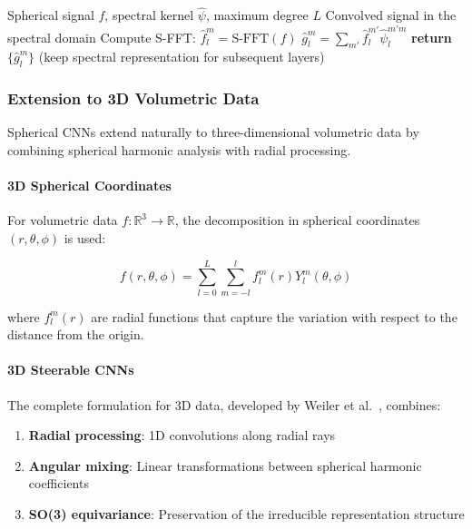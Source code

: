 \begin{algorithm}[h]
\caption{Efficient Spherical CNN Convolution}
\label{alg:spherical_conv}
\begin{algorithmic}[1]
\Require Spherical signal $f$, spectral kernel $\hat{\psi}$, maximum degree $L$
\Ensure Convolved signal in the spectral domain
\State Compute S-FFT: $\hat{f}_l^m = \text{S-FFT}(f)$
        \State $\hat{g}_l^m = \sum_{m'} \hat{f}_l^{m'} \hat{\psi}_l^{m'm}$
    \EndFor
\EndFor
\State \textbf{return} $\{\hat{g}_l^m\}$ (keep spectral representation for subsequent layers)
\end{algorithmic}
\end{algorithm}

\subsubsection{Extension to 3D Volumetric Data}

Spherical CNNs extend naturally to three-dimensional volumetric data by combining spherical harmonic analysis with radial processing.

\paragraph{3D Spherical Coordinates}

For volumetric data $f: \mathbb{R}^3 \to \mathbb{R}$, the decomposition in spherical coordinates $(r, \theta, \phi)$ is used:

\begin{equation}
f(r, \theta, \phi) = \sum_{l=0}^{L} \sum_{m=-l}^{l} f_l^m(r) Y_l^m(\theta, \phi)
\end{equation}

where $f_l^m(r)$ are radial functions that capture the variation with respect to the distance from the origin.

\paragraph{3D Steerable CNNs}

The complete formulation for 3D data, developed by Weiler et al.~\citep{weiler2018steerable}, combines:

\begin{enumerate}
    \item \textbf{Radial processing}: 1D convolutions along radial rays
    \item \textbf{Angular mixing}: Linear transformations between spherical harmonic coefficients
    \item \textbf{SO(3) equivariance}: Preservation of the irreducible representation structure
\end{enumerate}

